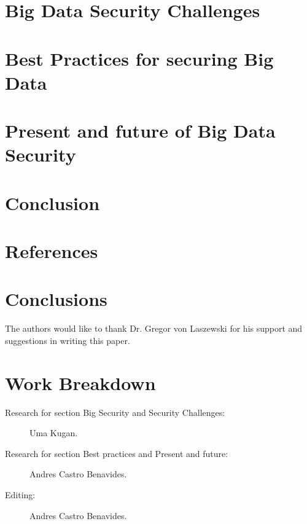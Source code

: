\documentclass[sigconf]{acmart}
\begin{document}
\section{Big Data Security Challenges}


\section{Best Practices for securing Big Data}


\section{Present and future of Big Data Security}


\section{Conclusion}

\section{References}



\section{Conclusions}



\begin{acks}
The authors would like to thank Dr. Gregor von Laszewski for his support and suggestions in writing this paper.
\end{acks}

 

\newpage

\appendix

\section{Work Breakdown}

\begin{description}

\item[Research for section Big Security and Security Challenges:] Uma Kugan.

\item[Research for section Best practices and Present and future:] Andres Castro Benavides.

\item[Editing:] Andres Castro Benavides.

\end{description}
\end{document}
